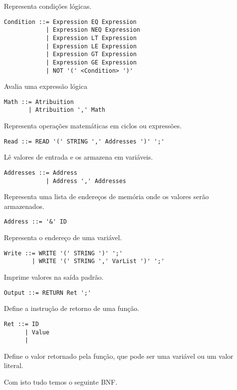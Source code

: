 \documentclass[12pt,a4paper]{report}
\begin{document}
Representa condições lógicas.
\begin{lstlisting}
Condition ::= Expression EQ Expression
            | Expression NEQ Expression
            | Expression LT Expression
            | Expression LE Expression
            | Expression GT Expression
            | Expression GE Expression
            | NOT '(' <Condition> ')'
\end{lstlisting}
Avalia uma expressão lógica
\begin{lstlisting}
Math ::= Atribuition
       | Atribuition ',' Math
\end{lstlisting}
Representa operações matemáticas em ciclos ou expressões.
\begin{lstlisting}
Read ::= READ '(' STRING ',' Addresses ')' ';'
\end{lstlisting}
Lê valores de entrada e os armazena em variáveis.
\begin{lstlisting}
Addresses ::= Address
            | Address ',' Addresses
\end{lstlisting}
Representa uma lista de endereços de memória onde os valores serão armazenados.
\begin{lstlisting}
Address ::= '&' ID
\end{lstlisting}
Representa o endereço de uma variável.
\begin{lstlisting}
Write ::= WRITE '(' STRING ')' ';'
        | WRITE '(' STRING ',' VarList ')' ';'
\end{lstlisting}
Imprime valores na saída padrão.
\begin{lstlisting}
Output ::= RETURN Ret ';'
\end{lstlisting}
Define a instrução de retorno de uma função.
\begin{lstlisting}
Ret ::= ID
      | Value
      | 
\end{lstlisting}
Define o valor retornado pela função, que pode ser uma variável ou um valor literal.


 
Com isto tudo temos o seguinte BNF.
\end{document}

